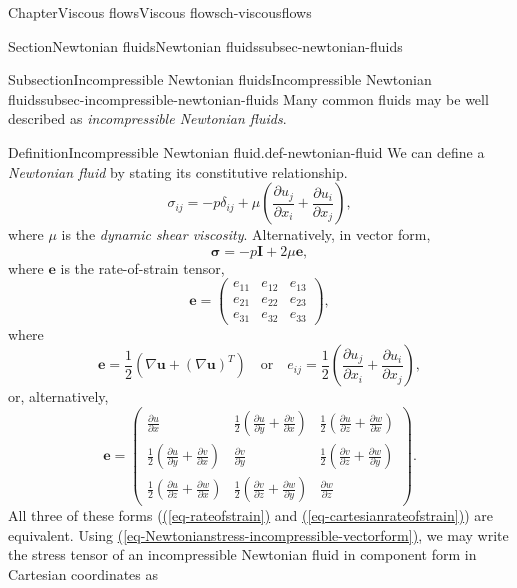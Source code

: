 \documentclass[oneside,10pt,]{book}
\newcommand{\xreffont}{\relax}
\numberwithin{equation}{section}
\newcommand{\pd}[2]{\frac{\partial#1}{\partial#2}}
\newcommand{\be}{\boldsymbol{e}}
\newcommand{\bu}{\boldsymbol{u}}
\newcommand{\bsigma}{\boldsymbol{\sigma}}
\newcommand{\bI}{\boldsymbol{I}}
\begin{document}
\begin{chapterptx}{Chapter}{Viscous flows}{}{Viscous flows}{}{}{ch-viscousflows}
\begin{sectionptx}{Section}{Newtonian fluids}{}{Newtonian fluids}{}{}{subsec-newtonian-fluids}
\begin{subsectionptx}{Subsection}{Incompressible Newtonian fluids}{}{Incompressible Newtonian fluids}{}{}{subsec-incompressible-newtonian-fluids}
Many common fluids may be well described as \emph{incompressible Newtonian fluids}.%
\begin{definition}{Definition}{Incompressible Newtonian fluid.}{}{def-newtonian-fluid}%
We can define a \emph{Newtonian fluid} by stating its constitutive relationship.%
\begin{equation}
\sigma_{ij}=-p\delta_{ij}
+\mu\left(\pd{u_j}{x_i}+\pd{u_i}{x_j}\right),\label{eq-Newtonianstress-incompressible}
\end{equation}
where \(\mu\) is the \emph{dynamic shear viscosity}. Alternatively, in vector form,%
\begin{equation}
\bsigma=-p\bI+2\mu\be,\label{eq-Newtonianstress-incompressible-vectorform}
\end{equation}
where \(\be\) is the rate-of-strain tensor,%
\begin{equation*}
\be=\left(\begin{matrix}
e_{11}&e_{12}&e_{13}\\
e_{21}&e_{22}&e_{23}\\
e_{31}&e_{32}&e_{33}
\end{matrix}\right),
\end{equation*}
where%
\begin{equation}
\be=\frac12\left(\nabla\bu+\left(\nabla\bu\right)^T\right)
\quad\textrm{or}\quad
e_{ij}=\frac12\left(\pd{u_j}{x_i}+\pd{u_i}{x_j}\right),\label{eq-rateofstrain}
\end{equation}
or, alternatively,%
\begin{equation}
\be=\left(\begin{array}{ccc}
\pd{u}{x}&\frac12\left(\pd{u}{y}+\pd{v}{x}\right)&\frac12\left(\pd{u}{z}+\pd{w}{x}\right)\\
\frac12\left(\pd{u}{y}+\pd{v}{x}\right)&\pd{v}{y}&\frac12\left(\pd{v}{z}+\pd{w}{y}\right)\\
\frac12\left(\pd{u}{z}+\pd{w}{x}\right)&\frac12\left(\pd{v}{z}+\pd{w}{y}\right)&\pd{w}{z}
\end{array}\right).\label{eq-cartesianrateofstrain}
\end{equation}
All three of these forms (\hyperref[eq-rateofstrain]{({\xreffont\ref{eq-rateofstrain}})} and \hyperref[eq-cartesianrateofstrain]{({\xreffont\ref{eq-cartesianrateofstrain}})}) are equivalent. Using \hyperref[eq-Newtonianstress-incompressible-vectorform]{({\xreffont\ref{eq-Newtonianstress-incompressible-vectorform}})}, we may write the stress tensor of an incompressible Newtonian fluid in component form in Cartesian coordinates as%
\begin{equation}

\end{equation}
\end{definition}
\end{subsectionptx}
\end{sectionptx}
\end{chapterptx}
\end{document}
